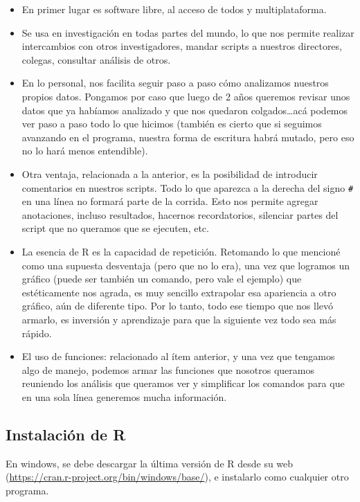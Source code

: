 \documentclass[
  letterpaper,
  DIV=11,
  numbers=noendperiod]{scrartcl}
\providecommand{\tightlist}{%
  \setlength{\itemsep}{0pt}\setlength{\parskip}{0pt}}\usepackage{longtable,booktabs,array}
\begin{document}
\begin{itemize}
\tightlist
\item
  En primer lugar es software libre, al acceso de todos y
  multiplataforma.
\item
  Se usa en investigación en todas partes del mundo, lo que nos permite
  realizar intercambios con otros investigadores, mandar scripts a
  nuestros directores, colegas, consultar análisis de otros.
\item
  En lo personal, nos facilita seguir paso a paso cómo analizamos
  nuestros propios datos. Pongamos por caso que luego de 2 años queremos
  revisar unos datos que ya habíamos analizado y que nos quedaron
  colgados\ldots acá podemos ver paso a paso todo lo que hicimos
  (también es cierto que si seguimos avanzando en el programa, nuestra
  forma de escritura habrá mutado, pero eso no lo hará menos
  entendible).
\item
  Otra ventaja, relacionada a la anterior, es la posibilidad de
  introducir comentarios en nuestros scripts. Todo lo que aparezca a la
  derecha del signo \texttt{\#} en una línea no formará parte de la
  corrida. Esto nos permite agregar anotaciones, incluso resultados,
  hacernos recordatorios, silenciar partes del script que no queramos
  que se ejecuten, etc.
\item
  La esencia de R es la capacidad de repetición. Retomando lo que
  mencioné como una supuesta desventaja (pero que no lo era), una vez
  que logramos un gráfico (puede ser también un comando, pero vale el
  ejemplo) que estéticamente nos agrada, es muy sencillo extrapolar esa
  apariencia a otro gráfico, aún de diferente tipo. Por lo tanto, todo
  ese tiempo que nos llevó armarlo, es inversión y aprendizaje para que
  la siguiente vez todo sea más rápido.
\item
  El uso de funciones: relacionado al ítem anterior, y una vez que
  tengamos algo de manejo, podemos armar las funciones que nosotros
  queramos reuniendo los análisis que queramos ver y simplificar los
  comandos para que en una sola línea generemos mucha información.
\end{itemize}

\hypertarget{instalaciuxf3n-de-r}{%
\subsection{Instalación de R}\label{instalaciuxf3n-de-r}}

En windows, se debe descargar la última versión de R desde su web
(\url{https://cran.r-project.org/bin/windows/base/}), e instalarlo como
cualquier otro programa.
\end{document}
